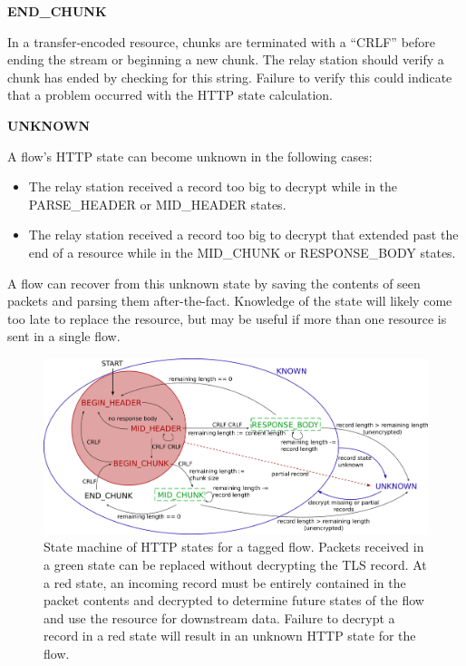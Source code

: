 \documentclass[11pt]{article}
\theoremstyle{definittion}
\begin{document}
\textbf{END\_CHUNK}

In a transfer-encoded resource, chunks are terminated with a ``CRLF'' before ending the stream or beginning a new chunk. The relay station should verify a chunk has ended by checking for this string. Failure to verify this could indicate that a problem occurred with the HTTP state calculation.

\textbf{UNKNOWN}

A flow's HTTP state can become unknown in the following cases:
\begin{itemize}
\item The relay station received a record too big to decrypt while in the PARSE\_HEADER or MID\_HEADER states.
\item The relay station received a record too big to decrypt that extended past the end of a resource while in the MID\_CHUNK or RESPONSE\_BODY states.
\end{itemize}

A flow can recover from this unknown state by saving the contents of seen packets and parsing them after-the-fact. Knowledge of the state will likely come too late to replace the resource, but may be useful if more than one resource is sent in a single flow.

\begin{figure}[h]
\includegraphics[width=\textwidth]{httpstate}
\caption{State machine of HTTP states for a tagged flow. Packets received in a green state can be replaced without decrypting the TLS record. At a red state, an incoming record must be entirely contained in the packet contents and decrypted to determine future states of the flow and use the resource for downstream data. Failure to decrypt a record in a red state will result in an unknown HTTP state for the flow.}
\end{figure}


\nocite{*}


 
\end{document}
